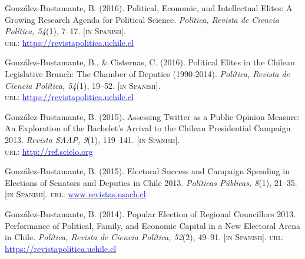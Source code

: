 \begin{publications}

\begin{benumerate}{9}
\item{\small Gonz\'alez-Bustamante, B. (2016). Political, Economic, and Intellectual Elites: A Growing Research Agenda for Political Science. {\itshape Pol\'itica, Revista de Ciencia Pol\'itica, 54}(1), 7--17. {\footnotesize \scshape [in Spanish]}. \\ {\scshape url}: \href{https://revistapolitica.uchile.cl/index.php/RP/article/view/42690}{\textcolor{blue}{https://revistapolitica.uchile.cl}}}\vspace{1mm}

\item{\small Gonz\'alez-Bustamante, B., \& Cisternas, C. (2016). Political Elites in the Chilean Legislative Branch: The Chamber of Deputies (1990-2014). {\itshape Pol\'itica, Revista de Ciencia Pol\'itica, 54}(1), 19--52. {\footnotesize \scshape [in Spanish]}. \\ {\scshape url}: \href{https://revistapolitica.uchile.cl/index.php/RP/article/view/42691}{\textcolor{blue}{https://revistapolitica.uchile.cl}}}\vspace{1mm}

\item{\small Gonz\'alez-Bustamante, B. (2015). Assessing Twitter as a Public Opinion Measure: An Exploration of the Bachelet's Arrival to the Chilean Presidential Campaign 2013. {\itshape Revista SAAP, 9}(1), 119--141. {\footnotesize \scshape [in Spanish]}. \\ {\scshape url}: \href{http://ref.scielo.org/dwzhns}{\textcolor{blue}{http://ref.scielo.org}}} \vspace{1mm}

\item{\small Gonz\'alez-Bustamante, B. (2015). Electoral Success and Campaign Spending in Elections of Senators and Deputies in Chile 2013. {\itshape Pol\'iticas P\'ublicas, 8}(1), 21--35. {\footnotesize \scshape [in Spanish]}. {\scshape url}: \href{http://www.revistas.usach.cl/ojs/index.php/politicas/article/view/2182}{\textcolor{blue}{www.revistas.usach.cl}}} \vspace{1mm}

\item{\small Gonz\'alez-Bustamante, B. (2014). Popular Election of Regional Councillors 2013. Performance of Political, Family, and Economic Capital in a New Electoral Arena in Chile. {\itshape Pol\'itica, Revista de Ciencia Pol\'itica, 52}(2), 49--91. {\footnotesize \scshape [in Spanish]}. {\scshape url}: \href{https://revistapolitica.uchile.cl/index.php/RP/article/view/36137}{\textcolor{blue}{https://revistapolitica.uchile.cl}}} \vspace{1mm}


\end{benumerate}
\end{publications}
